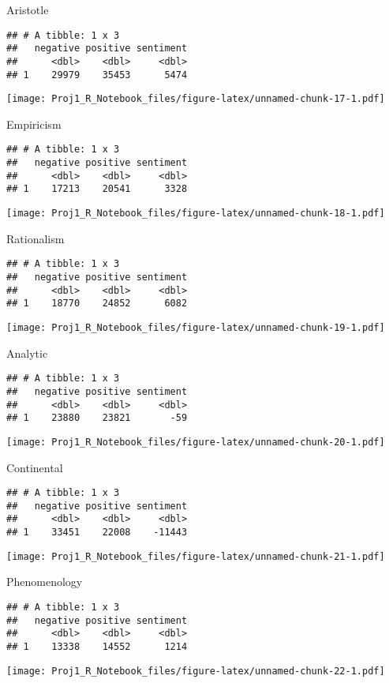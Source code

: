 \documentclass[
]{article}
\begin{document}
Aristotle

\begin{verbatim}
## # A tibble: 1 x 3
##   negative positive sentiment
##      <dbl>    <dbl>     <dbl>
## 1    29979    35453      5474
\end{verbatim}

\texttt{[image: Proj1\_R\_Notebook\_files/figure-latex/unnamed-chunk-17-1.pdf]}

Empiricism

\begin{verbatim}
## # A tibble: 1 x 3
##   negative positive sentiment
##      <dbl>    <dbl>     <dbl>
## 1    17213    20541      3328
\end{verbatim}

\texttt{[image: Proj1\_R\_Notebook\_files/figure-latex/unnamed-chunk-18-1.pdf]}

Rationalism

\begin{verbatim}
## # A tibble: 1 x 3
##   negative positive sentiment
##      <dbl>    <dbl>     <dbl>
## 1    18770    24852      6082
\end{verbatim}

\texttt{[image: Proj1\_R\_Notebook\_files/figure-latex/unnamed-chunk-19-1.pdf]}

Analytic

\begin{verbatim}
## # A tibble: 1 x 3
##   negative positive sentiment
##      <dbl>    <dbl>     <dbl>
## 1    23880    23821       -59
\end{verbatim}

\texttt{[image: Proj1\_R\_Notebook\_files/figure-latex/unnamed-chunk-20-1.pdf]}

Continental

\begin{verbatim}
## # A tibble: 1 x 3
##   negative positive sentiment
##      <dbl>    <dbl>     <dbl>
## 1    33451    22008    -11443
\end{verbatim}

\texttt{[image: Proj1\_R\_Notebook\_files/figure-latex/unnamed-chunk-21-1.pdf]}

Phenomenology

\begin{verbatim}
## # A tibble: 1 x 3
##   negative positive sentiment
##      <dbl>    <dbl>     <dbl>
## 1    13338    14552      1214
\end{verbatim}

\texttt{[image: Proj1\_R\_Notebook\_files/figure-latex/unnamed-chunk-22-1.pdf]}
\end{document}
